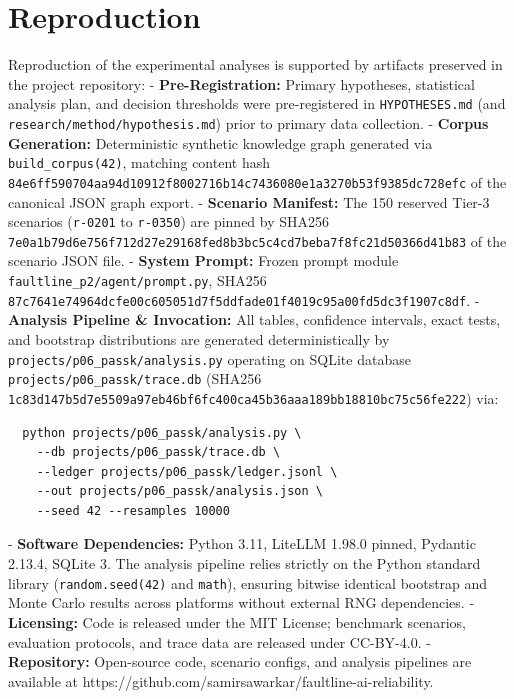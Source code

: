 \documentclass[11pt,letterpaper]{article}
\begin{document}
\section{Reproduction}

Reproduction of the experimental analyses is supported by artifacts preserved in the project repository:
- \textbf{Pre-Registration:} Primary hypotheses, statistical analysis plan, and decision thresholds were pre-registered in \texttt{HYPOTHESES.md} (and \texttt{research/method/hypothesis.md}) prior to primary data collection.
- \textbf{Corpus Generation:} Deterministic synthetic knowledge graph generated via \texttt{build\_corpus(42)}, matching content hash \nolinkurl{84e6ff590704aa94d10912f8002716b14c7436080e1a3270b53f9385dc728efc} of the canonical JSON graph export.
- \textbf{Scenario Manifest:} The 150 reserved Tier-3 scenarios (\texttt{r-0201} to \texttt{r-0350}) are pinned by SHA256 \nolinkurl{7e0a1b79d6e756f712d27e29168fed8b3bc5c4cd7beba7f8fc21d50366d41b83} of the scenario JSON file.
- \textbf{System Prompt:} Frozen prompt module \texttt{faultline\_p2/agent/prompt.py}, SHA256 \nolinkurl{87c7641e74964dcfe00c605051d7f5ddfade01f4019c95a00fd5dc3f1907c8df}.
- \textbf{Analysis Pipeline \& Invocation:} All tables, confidence intervals, exact tests, and bootstrap distributions are generated deterministically by \texttt{projects/p06\_passk/analysis.py} operating on SQLite database \texttt{projects/p06\_passk/trace.db} (SHA256 \nolinkurl{1c83d147b5d7e5509a97eb46bf6fc400ca45b36aaa189bb18810bc75c56fe222}) via:
  
\begin{verbatim}
  python projects/p06_passk/analysis.py \
    --db projects/p06_passk/trace.db \
    --ledger projects/p06_passk/ledger.jsonl \
    --out projects/p06_passk/analysis.json \
    --seed 42 --resamples 10000
\end{verbatim}

- \textbf{Software Dependencies:} Python 3.11, LiteLLM 1.98.0 pinned, Pydantic 2.13.4, SQLite 3. The analysis pipeline relies strictly on the Python standard library (\texttt{random.seed(42)} and \texttt{math}), ensuring bitwise identical bootstrap and Monte Carlo results across platforms without external RNG dependencies.
- \textbf{Licensing:} Code is released under the MIT License; benchmark scenarios, evaluation protocols, and trace data are released under CC-BY-4.0.
- \textbf{Repository:} Open-source code, scenario configs, and analysis pipelines are available at https://github.com/samirsawarkar/faultline-ai-reliability.
\end{document}
